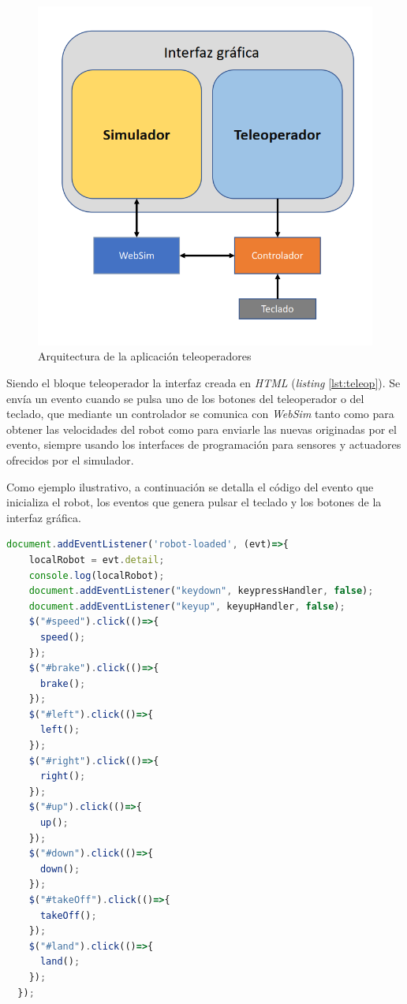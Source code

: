 \begin{figure}[H]
    \centering            
    \includegraphics[scale=0.5]{img/arquitecturaTeleoperador.png}
    \caption{Arquitectura de la aplicación teleoperadores} 
    \label{fig:arq_teleop}
\end{figure}

Siendo el bloque teleoperador la interfaz creada en \textit{HTML} (\textit{listing} \ref{lst:teleop}). Se envía un evento cuando se pulsa uno de los botones del teleoperador o del teclado, que mediante un controlador se comunica con \textit{WebSim} tanto como para obtener las velocidades del robot como para enviarle las nuevas originadas por el evento, siempre usando los interfaces de programación para sensores y actuadores ofrecidos por el simulador.

Como ejemplo ilustrativo, a continuación se detalla el código del evento que inicializa el robot, los eventos que genera pulsar el teclado y los botones de la interfaz gráfica.

\begin{lstlisting}[language=javascript,label=list:traduccion]
  document.addEventListener('robot-loaded', (evt)=>{
    localRobot = evt.detail;
    console.log(localRobot);
    document.addEventListener("keydown", keypressHandler, false);
    document.addEventListener("keyup", keyupHandler, false);
    $("#speed").click(()=>{
      speed();
    });
    $("#brake").click(()=>{
      brake();
    });
    $("#left").click(()=>{
      left();
    });
    $("#right").click(()=>{
      right();
    });
    $("#up").click(()=>{
      up();
    });
    $("#down").click(()=>{
      down();
    });
    $("#takeOff").click(()=>{
      takeOff();
    });
    $("#land").click(()=>{
      land();
    });
  });
\end{lstlisting}

